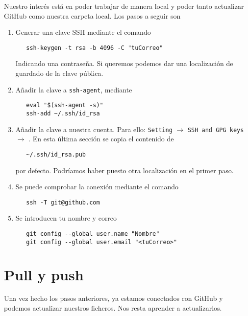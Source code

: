 Nuestro interés está en poder trabajar de manera local y poder tanto actualizar
GitHub como nuestra carpeta local. Los pasos a seguir son
\begin{enumerate}
\item Generar una clave SSH mediante el comando
\begin{verbatim}
   ssh-keygen -t rsa -b 4096 -C "tuCorreo"
\end{verbatim}
  Indicando una contraseña. Si queremos podemos dar una localización de guardado
  de la clave pública.
\item Añadir la clave a \texttt{ssh-agent}, mediante
\begin{verbatim}
   eval "$(ssh-agent -s)"
   ssh-add ~/.ssh/id_rsa
\end{verbatim}

\item Añadir la clave a nuestra cuenta. Para ello: \texttt{Setting}
  $\rightarrow$ \texttt{SSH and GPG keys}
  $\rightarrow$ . En esta última sección se copia el
  contenido de
\begin{verbatim}
   ~/.ssh/id_rsa.pub
\end{verbatim}
 por defecto. Podríamos haber puesto otra localización en el primer paso.
\item Se puede comprobar la conexión mediante el comando
\begin{verbatim}
   ssh -T git@github.com
\end{verbatim}
\item Se introducen tu nombre y correo
\begin{verbatim}
   git config --global user.name "Nombre"
   git config --global user.email "<tuCorreo>"
\end{verbatim}
\end{enumerate}

\section{Pull y push}

Una vez hecho los pasos anteriores, ya estamos conectados con GitHub y podemos
actualizar nuestros ficheros. Nos resta aprender a actualizarlos.

